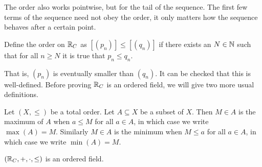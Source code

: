 \documentclass[../main.tex]{subfiles}
\begin{document}
The order also works pointwise, but for the tail of the sequence. The first few terms of the sequence need not obey the order, it only matters how the sequence behaves after a certain point.
\begin{definition}\label{dfn:the_real_numbers:cantor_order}
    Define the order on $\mathbb{R}_C$ as $[(p_n)]\leq[(q_n)]$ if there exists an $N\in\mathbb{N}$ such that for all $n\geq N$ it is true that $p_n\leq q_n$.
\end{definition}
That is, $(p_n)$ is eventually smaller than $(q_n)$. It can be checked that this is well-defined. Before proving $\mathbb{R}_C$ is an ordered field, we will give two more usual definitions.
\begin{definition}
    Let $(X,\leq)$ be a total order. Let $A\subseteq X$ be a subset of $X$. Then $M\in A$ is the maximum of $A$ when $a\leq M$ for all $a\in A$, in which case we write $\max(A)=M$. Similarly $M\in A$ is the minimum when $M\leq a$ for all $a\in A$, in which case we write $\min(A)=M$.
\end{definition}
\begin{proposition}\label{prp:the_real_numbers:cantor_ordered_field_real_numbers}
    $(\mathbb{R}_C,+,\cdot,\leq)$ is an ordered field.
\end{proposition}
\end{document}
